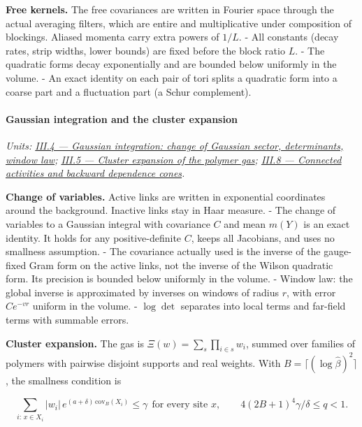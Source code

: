 \documentclass[
  letterpaper,
  11pt]{article}
\begin{document}
\textbf{Free kernels.} The free covariances are written in Fourier space
through the actual averaging filters, which are entire and
multiplicative under composition of blockings. Aliased momenta carry
extra powers of \(1/L\). - All constants (decay rates, strip widths,
lower bounds) are fixed before the block ratio \(L\). - The quadratic
forms decay exponentially and are bounded below uniformly in the volume.
- An exact identity on each pair of tori splits a quadratic form into a
coarse part and a fluctuation part (a Schur complement).

\paragraph{Gaussian integration and the cluster
expansion}\label{gaussian-integration-and-the-cluster-expansion}

\emph{Units:
\href{https://github.com/scottnarmstrong/yang-mills-informalization/blob/main/outline/units/III-4.md}{III.4
--- Gaussian integration: change of Gaussian sector, determinants,
window law};
\href{https://github.com/scottnarmstrong/yang-mills-informalization/blob/main/outline/units/III-5.md}{III.5
--- Cluster expansion of the polymer gas};
\href{https://github.com/scottnarmstrong/yang-mills-informalization/blob/main/outline/units/III-8.md}{III.8
--- Connected activities and backward dependence cones}.}

\textbf{Change of variables.} Active links are written in exponential
coordinates around the background. Inactive links stay in Haar measure.
- The change of variables to a Gaussian integral with covariance \(C\)
and mean \(m(Y)\) is an exact identity. It holds for any
positive-definite \(C\), keeps all Jacobians, and uses no smallness
assumption. - The covariance actually used is the inverse of the
gauge-fixed Gram form on the active links, not the inverse of the Wilson
quadratic form. Its precision is bounded below uniformly in the volume.
- Window law: the global inverse is approximated by inverses on windows
of radius \(r\), with error \(Ce^{-vr}\) uniform in the volume. -
\(\log\det\) separates into local terms and far-field terms with
summable errors.

\textbf{Cluster expansion.} The gas is
\(\Xi(w)=\sum_s\prod_{i\in s}w_i\), summed over families of polymers
with pairwise disjoint supports and real weights. With
\(B=\lceil(\log\hat\beta)^2\rceil\), the smallness condition is

\[\sum_{i:\,x\in X_i}|w_i|\,e^{(a+\delta)\,\mathrm{cov}_B(X_i)}\le\gamma\ \ \text{for every site }x,\qquad 4(2B+1)^4\gamma/\delta\le q<1 .\]
\end{document}

